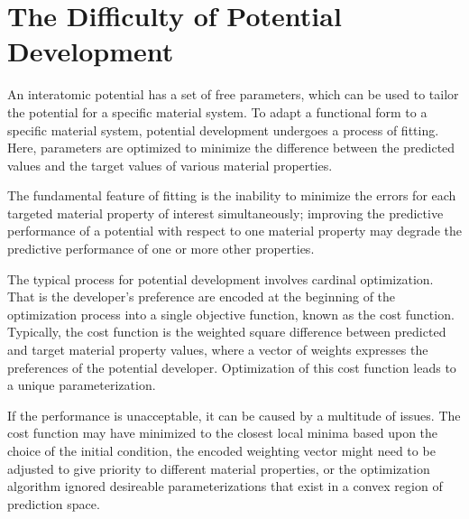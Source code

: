 \section{The Difficulty of Potential Development}


An interatomic potential has a set of free parameters, which can be used to tailor the potential for a specific material system.  To adapt a functional form to a specific material system, potential development undergoes a process of fitting.  Here, parameters are optimized to minimize the difference between the predicted values and the target values of various material properties.

The fundamental feature of fitting is the inability to minimize the errors for each targeted material property of interest simultaneously; improving the predictive performance of a potential with respect to one material property may degrade the predictive performance of one or more other properties.

The typical process for potential development involves cardinal optimization.  That is the developer's preference are encoded at the beginning of the optimization process into a single objective function, known as the cost function.  Typically, the cost function is the weighted square difference between predicted and target material property values, where a vector of weights expresses the preferences of the potential developer.  Optimization of this cost function leads to a unique parameterization.

If the performance is unacceptable, it can be caused by a multitude of issues.  The cost function may have minimized to the closest local minima based upon the choice of the initial condition, the encoded weighting vector might need to be adjusted to give priority to different material properties, or the optimization algorithm ignored desireable parameterizations that exist in a convex region of prediction space.

